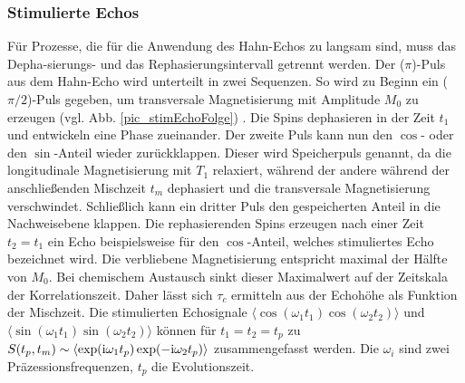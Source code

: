 \subsubsection{Stimulierte Echos}
Für Prozesse, die für die Anwendung des Hahn-Echos zu langsam sind, muss das Depha-sierungs- und das Rephasierungsintervall getrennt werden. Der ($\pi$)-Puls
aus dem Hahn-Echo wird unterteilt in zwei Sequenzen. So wird zu Beginn ein ($\pi/2$)-Puls gegeben, um transversale Magnetisierung mit Amplitude $M_0$ zu
erzeugen (vgl. Abb. \ref{pic_stimEchoFolge}) . Die Spins dephasieren in der Zeit $t_1$ und entwickeln eine Phase zueinander. Der zweite Puls kann nun den 
$\cos$- oder den $\sin$-Anteil wieder zurückklappen. Dieser wird Speicherpuls genannt, da die longitudinale Magnetisierung mit $T_1$ relaxiert, während
der andere während der anschließenden Mischzeit $t_m$ dephasiert und die transversale Magnetisierung verschwindet. Schließlich kann ein dritter Puls den
gespeicherten Anteil in die Nachweisebene klappen. Die rephasierenden Spins erzeugen nach einer Zeit $t_2 = t_1$ ein Echo beispielsweise für den $\cos$-Anteil,
welches stimuliertes Echo bezeichnet wird. Die verbliebene Magnetisierung entspricht maximal der Hälfte von $M_0$. Bei chemischem Austausch sinkt dieser
Maximalwert auf der Zeitskala der Korrelationszeit. Daher lässt sich $\tau_c$ ermitteln aus der Echohöhe als Funktion der Mischzeit. Die stimulierten 
Echosignale $\langle\cos(\omega_1t_1)\cos(\omega_2t_2)\rangle$ und $\langle\sin(\omega_1t_1)\sin(\omega_2t_2)\rangle$ können für $t_1=t_2=t_p$ zu
$S(t_p,t_m) \sim \langle\exp(\text{i}\omega_1t_p)\exp(-\text{i}\omega_2t_p)\rangle$ zusammengefasst werden. Die $\omega_i$ sind zwei Präzessionsfrequenzen, $t_p$ die
Evolutionszeit.

